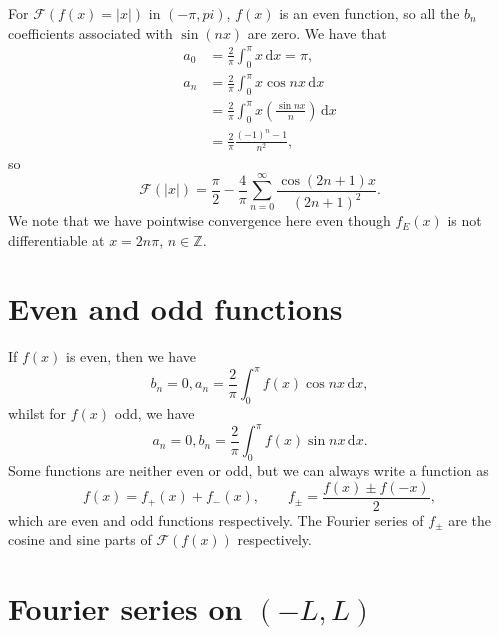 \documentclass[letter-paper]{tufte-book}
\newenvironment{example}[1][Example]{\begin{trivlist}
\item[\hskip \labelsep {\bfseries #1}]}{\end{trivlist}}
\begin{document}
\begin{example}
  For $\mathcal{F}(f(x)=|x|)$ in $(-\pi,pi)$, $f(x)$ is an even function, so all
  the $b_n$ coefficients associated with $\sin(nx)$ are zero. We have that
  \begin{align*}
    a_0 &= \frac{2}{\pi}\int_0^\pi x\, \mathrm{d}x = \pi, \\
    a_n &= \frac{2}{\pi}\int_0^\pi x\cos nx\, \mathrm{d}x \\
      &= \frac{2}{\pi}\int_0^\pi x\left(\frac{\sin nx}{n}\right)\, \mathrm{d}x \\
      &= \frac{2}{\pi}\frac{(-1)^n - 1}{n^2},
  \end{align*}
  so
  \begin{equation*}
    \mathcal{F}(|x|) = \frac{\pi}{2} - 
    \frac{4}{\pi}\sum_{n=0}^\infty \frac{\cos(2n+1)x}{(2n+1)^2}.
  \end{equation*}
  We note that we have pointwise convergence here even though $f_E(x)$ is not
  differentiable at $x=2n\pi$, $n\in\mathbb{Z}$.
\end{example}


\section{Even and odd functions}

If $f(x)$ is even, then we have
\begin{equation*}
  b_n = 0, a_n = \frac{2}{\pi}\int_0^\pi f(x)\cos nx\, \mathrm{d}x,
\end{equation*}
whilst for $f(x)$ odd, we have
\begin{equation*}
  a_n = 0, b_n = \frac{2}{\pi}\int_0^\pi f(x)\sin nx\, \mathrm{d}x.
\end{equation*}
Some functions are neither even or odd, but we can always write a function as
\begin{equation*}
  f(x)= f_+(x) + f_-(x),\qquad f_\pm = \frac{f(x)\pm f(-x)}{2},
\end{equation*}
which are even and odd functions respectively. The Fourier series of $f_\pm$ are
the cosine and sine parts of $\mathcal{F}(f(x))$ respectively.


\section{Fourier series on $(-L,L)$}
\end{document}
